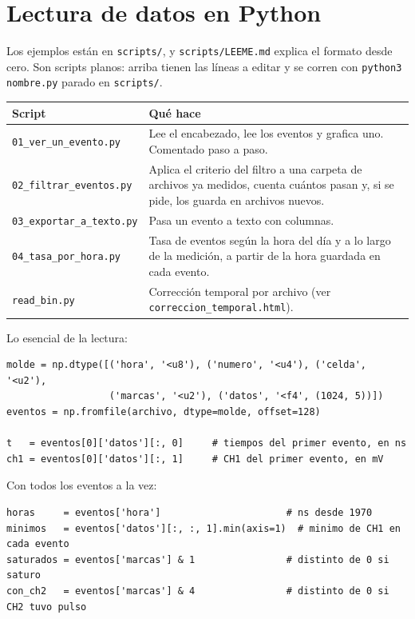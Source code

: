 \documentclass[11pt,a4paper]{article}
\newcommand{\code}[1]{\texttt{#1}}
\begin{document}
\section{Lectura de datos en Python}

Los ejemplos están en \code{scripts/}, y \code{scripts/LEEME.md} explica el formato
desde cero. Son scripts planos: arriba tienen las líneas a editar y se corren con
\code{python3 nombre.py} parado en \code{scripts/}.

\begin{center}
\begin{tabular}{lp{9.5cm}}
\toprule
Script & Qué hace \\
\midrule
\code{01\_ver\_un\_evento.py} & Lee el encabezado, lee los eventos y grafica uno. Comentado paso a paso. \\
\code{02\_filtrar\_eventos.py} & Aplica el criterio del filtro a una carpeta de archivos ya medidos, cuenta cuántos pasan y, si se pide, los guarda en archivos nuevos. \\
\code{03\_exportar\_a\_texto.py} & Pasa un evento a texto con columnas. \\
\code{04\_tasa\_por\_hora.py} & Tasa de eventos según la hora del día y a lo largo de la medición, a partir de la hora guardada en cada evento. \\
\code{read\_bin.py} & Corrección temporal por archivo (ver \code{correccion\_temporal.html}). \\
\bottomrule
\end{tabular}
\end{center}

Lo esencial de la lectura:

\begin{lstlisting}[style=py]
molde = np.dtype([('hora', '<u8'), ('numero', '<u4'), ('celda', '<u2'),
                  ('marcas', '<u2'), ('datos', '<f4', (1024, 5))])
eventos = np.fromfile(archivo, dtype=molde, offset=128)

t   = eventos[0]['datos'][:, 0]     # tiempos del primer evento, en ns
ch1 = eventos[0]['datos'][:, 1]     # CH1 del primer evento, en mV
\end{lstlisting}

Con todos los eventos a la vez:

\begin{lstlisting}[style=py]
horas     = eventos['hora']                      # ns desde 1970
minimos   = eventos['datos'][:, :, 1].min(axis=1)  # minimo de CH1 en cada evento
saturados = eventos['marcas'] & 1                # distinto de 0 si saturo
con_ch2   = eventos['marcas'] & 4                # distinto de 0 si CH2 tuvo pulso
\end{lstlisting}
\end{document}
